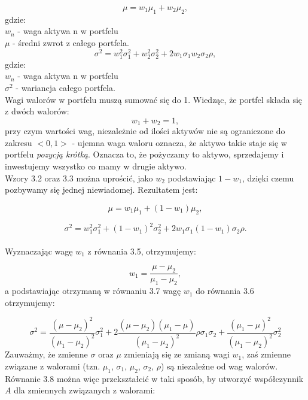 \documentclass[magister]{dyplom}
\begin{document}
\begin{equation}
	\mu = w_1\mu_1 + w_2\mu_2,
\end{equation}
gdzie:\\
$w_n$ - waga aktywa n w portfelu\\
$\mu$ - średni zwrot z całego portfela.\\
\begin{equation}
	\sigma^2 = w_1^{2}\sigma_1^{2} + w_2^{2}\sigma_2^{2} + 2w_1\sigma_1w_2\sigma_2\rho, 
\end{equation}
gdzie:\\
$w_n$ - waga aktywa n w portfelu\\
$\sigma^2$ - wariancja całego portfela.\\
Wagi walorów w portfelu muszą sumować się do 1. Wiedząc, że portfel składa się z dwóch walorów:
\begin{equation}
	w_1 + w_2 = 1,
\end{equation}
przy czym wartości wag, niezależnie od ilości aktywów nie są ograniczone do zakresu $<0,1>$ - ujemna waga waloru oznacza, że aktywo takie staje się w portfelu \textit{pozycją krótką}. Oznacza to, że pożyczamy to aktywo, sprzedajemy i inwestujemy wszystko co mamy w drugie aktywo.\\
Wzory 3.2 oraz 3.3 można uprościć, jako $w_2$ podstawiając $1 - w_1$, dzięki czemu pozbywamy się jednej niewiadomej. Rezultatem jest:

\begin{equation}
	\mu = w_1\mu_1 + (1 - w_1)\mu_2 ,
\end{equation}

\begin{equation}
	\sigma^2 = w_1^{2}\sigma_1^{2} + (1 - w_1)^{2}\sigma_2^{2} + 2w_1\sigma_1(1 - w_1)\sigma_2\rho.
\end{equation}
\\
Wyznaczając wagę $w_1$ z równania 3.5, otrzymujemy:

\begin{equation}
	w_1 = \frac{\mu - \mu_2}{\mu_1 - \mu_2},
\end{equation}
a podstawiając otrzymaną w równaniu 3.7 wagę $w_1$ do równania 3.6 otrzymujemy:

\begin{equation}
	\sigma^2 = \frac{(\mu - \mu_2)^2}{(\mu_1 - \mu_2)^2}\sigma_1^{2} + 2\frac{(\mu - \mu_2)(\mu_1 - \mu)}{(\mu_1 - \mu_2)^2}\rho\sigma_1\sigma_2 + \frac{(\mu_1 - \mu)^2}{(\mu_1 - \mu_2)^2}\sigma_2^{2}
\end{equation}
Zauważmy, że zmienne $\sigma$ oraz $\mu$ zmieniają się ze zmianą wagi $w_1$, zaś zmienne związane z walorami (tzn. $\mu_1$, $\sigma_1$, $\mu_2$, $\sigma_2$, $\rho$) są niezależne od wag walorów. Równanie 3.8 można więc przekształcić w taki sposób, by utworzyć współczynnik $A$ dla zmiennych związanych z walorami:
\end{document}
